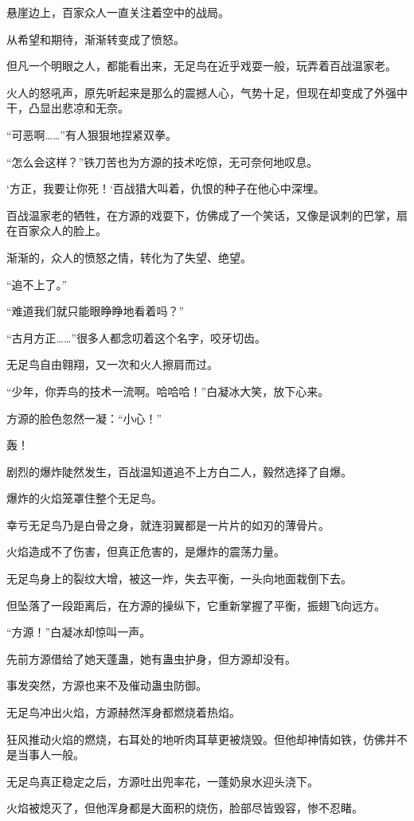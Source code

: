 \begin{this_body}
悬崖边上，百家众人一直关注着空中的战局。

从希望和期待，渐渐转变成了愤怒。

但凡一个明眼之人，都能看出来，无足鸟在近乎戏耍一般，玩弄着百战温家老。

火人的怒吼声，原先听起来是那么的震撼人心，气势十足，但现在却变成了外强中干，凸显出悲凉和无奈。

“可恶啊……”有人狠狠地捏紧双拳。

“怎么会这样？”铁刀苦也为方源的技术吃惊，无可奈何地叹息。

‘方正，我要让你死！‘百战猎大叫着，仇恨的种子在他心中深埋。

百战温家老的牺牲，在方源的戏耍下，仿佛成了一个笑话，又像是讽刺的巴掌，扇在百家众人的脸上。

渐渐的，众人的愤怒之情，转化为了失望、绝望。

“追不上了。”

“难道我们就只能眼睁睁地看着吗？”

“古月方正……”很多人都念叨着这个名字，咬牙切齿。

无足鸟自由翱翔，又一次和火人擦肩而过。

“少年，你弄鸟的技术一流啊。哈哈哈！”白凝冰大笑，放下心来。

方源的脸色忽然一凝：“小心！”

轰！

剧烈的爆炸陡然发生，百战温知道追不上方白二人，毅然选择了自爆。

爆炸的火焰笼罩住整个无足鸟。

幸亏无足鸟乃是白骨之身，就连羽翼都是一片片的如刃的薄骨片。

火焰造成不了伤害，但真正危害的，是爆炸的震荡力量。

无足鸟身上的裂纹大增，被这一炸，失去平衡，一头向地面栽倒下去。

但坠落了一段距离后，在方源的操纵下，它重新掌握了平衡，振翅飞向远方。

“方源！”白凝冰却惊叫一声。

先前方源借给了她天蓬蛊，她有蛊虫护身，但方源却没有。

事发突然，方源也来不及催动蛊虫防御。

无足鸟冲出火焰，方源赫然浑身都燃烧着热焰。

狂风推动火焰的燃烧，右耳处的地听肉耳草更被烧毁。但他却神情如铁，仿佛并不是当事人一般。

无足鸟真正稳定之后，方源吐出兜率花，一蓬奶泉水迎头浇下。

火焰被熄灭了，但他浑身都是大面积的烧伤，脸部尽皆毁容，惨不忍睹。


\end{this_body}
